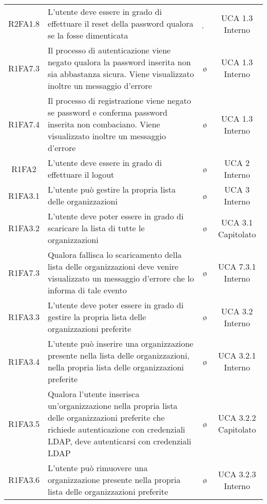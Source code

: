 {\begin{longtable}{ c C{4cm} c c}
R2FA1.8 & L'utente deve essere in grado di effettuare il reset della password qualora se la fosse dimenticata & \d & UCA 1.3 Interno\\

R1FA7.3 & Il processo di autenticazione viene negato qualora la password inserita non sia abbastanza sicura. Viene visualizzato inoltre un messaggio d'errore & \o & UCA 1.3 Interno\\

R1FA7.4 & Il processo di registrazione viene negato se password e conferma password inserita non combaciano. Viene visualizzato inoltre un messaggio d'errore & \o & UCA 1.3 Interno\\


R1FA2 & L'utente deve essere in grado di effettuare il logout & \o & UCA 2 Interno\\

R1FA3.1 & L'utente può gestire la propria lista delle organizzazioni& \o & UCA 3 Interno\\

R1FA3.2 & L'utente deve poter essere in grado di scaricare la lista di tutte le organizzazioni & \o & UCA 3.1 Capitolato \\

R1FA7.3 & Qualora fallisca lo scaricamento della lista delle organizzazioni deve venire visualizzato un messaggio d'errore che lo informa di tale evento & \o & UCA 7.3.1 Interno \\

R1FA3.3 & L’utente deve poter essere in grado di gestire la propria lista delle organizzazioni preferite & \o & UCA 3.2 Interno \\

R1FA3.4 & L’utente può inserire una organizzazione presente nella lista delle organizzazioni, nella propria lista delle organizzazioni preferite & \o & UCA 3.2.1 Interno \\

R1FA3.5 & Qualora l’utente inserisca un'organizzazione nella propria lista delle organizzazioni preferite che richiede autenticazione con credenziali LDAP, deve autenticarsi con credenziali LDAP & \o & UCA 3.2.2 Capitolato\\

R1FA3.6 & L’utente può rimuovere una organizzazione presente nella propria lista delle organizzazioni preferite & \o & UCA 3.2.3 Interno \\


\end{longtable}}
